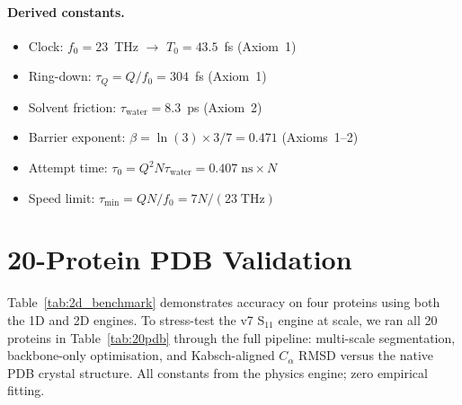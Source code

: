 \paragraph{Derived constants.}
\begin{itemize}
    \item Clock: $f_0 = 23$~THz $\to$ $T_0 = 43.5$~fs (Axiom~1)
    \item Ring-down: $\tau_Q = Q/f_0 = 304$~fs (Axiom~1)
    \item Solvent friction: $\tau_\text{water} = 8.3$~ps (Axiom~2)
    \item Barrier exponent: $\beta = \ln(3) \times 3/7 = 0.471$ (Axioms~1--2)
    \item Attempt time: $\tau_0 = Q^2 N \tau_\text{water} = 0.407\;\text{ns} \times N$
    \item Speed limit: $\tau_\text{min} = QN/f_0 = 7N/(23\;\text{THz})$
\end{itemize}

\section{20-Protein PDB Validation}
\label{sec:pdb_validation}

Table~\ref{tab:2d_benchmark} demonstrates accuracy on four proteins using both the 1D and 2D engines.
To stress-test the v7 S$_{11}$ engine at scale, we ran all 20 proteins in Table~\ref{tab:20pdb} through the full pipeline:
multi-scale segmentation, backbone-only optimisation, and Kabsch-aligned $C_\alpha$ RMSD versus the native PDB crystal structure.
All constants from the physics engine; zero empirical fitting.

